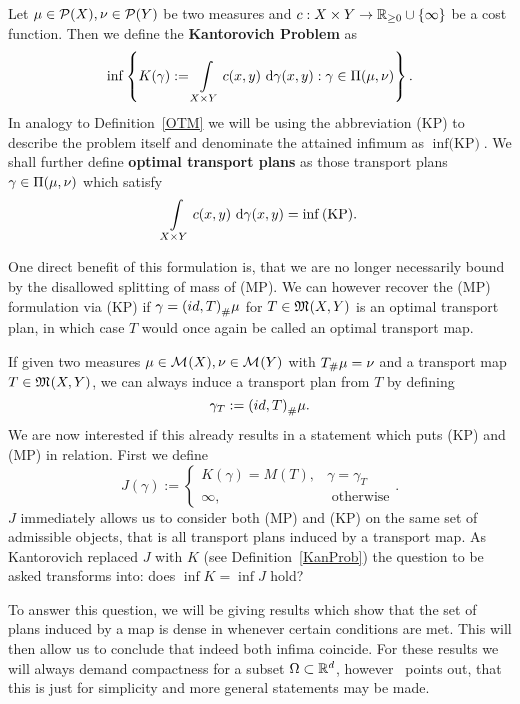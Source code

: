 \begin{definition}\label{KanProb}
	Let $\mu \in \PM{X}, \nu \in \PM{Y}$ be two measures and $\map[c]{X \times Y}{\RZero \cup \{\infty\}}$ be a cost function. Then we define the \textbf{Kantorovich Problem} as
	\begin{equation}\label{KP}
		\inf \left\{ K(\gamma) := \int\limits_{X \times Y} c(x, y)~\Dx[x, y]{\gamma} : \gamma \in \TP{\mu}{\nu} \right\}.
	\end{equation}
	In analogy to Definition~\ref{OTM} we will be using the abbreviation (KP) to describe the problem itself and denominate the attained infimum as $\inf \text{(KP)}$. We shall further define \textbf{optimal transport plans} as those transport plans $\gamma \in \TP{\mu}{\nu}$ which satisfy
	\[ \int\limits_{X \times Y} c(x, y)~\Dx[x, y]{\gamma} = \inf \text{(KP)}. \]
\end{definition}

One direct benefit of this formulation is, that we are no longer necessarily bound by the disallowed splitting of mass of (MP). We can however recover the (MP) formulation via (KP) if $\gamma = \push[(id, T)]{\mu}$ for $T \in \MF{X}{Y}$ is an optimal transport plan, in which case $T$ would once again be called an optimal transport map.

If given two measures $\mu \in \M{X}, \nu \in \M{Y}$ with $\push{\mu} = \nu$ and a transport map $T \in \MF{X}{Y}$, we can always induce a transport plan from $T$ by defining
\begin{equation}\label{IndPlan}
	\gamma_T := \push[(id, T)]{\mu}.
\end{equation}
We are now interested if this already results in a statement which puts (KP) and (MP) in relation. First we define
\[ J(\gamma) := 
	\begin{cases}
		K(\gamma) = M(T), & \gamma = \gamma_T \\
		\infty, & \text{ otherwise}
	\end{cases}. \]
$J$ immediately allows us to consider both (MP) and (KP) on the same set of admissible objects, that is all transport plans induced by a transport map. As Kantorovich replaced $J$ with $K$ (see Definition~\ref{KanProb}) the question to be asked transforms into: does $\inf K = \inf J$ hold?

To answer this question, we will be giving results which show that the set of plans induced by a map is dense in \TP{\mu, \nu} whenever certain conditions are met. This will then allow us to conclude that indeed both infima coincide. For these results we will always demand compactness for a subset $\Omega \subset \R^d$, however~\cite{San2015} points out, that this is just for simplicity and more general statements may be made.

